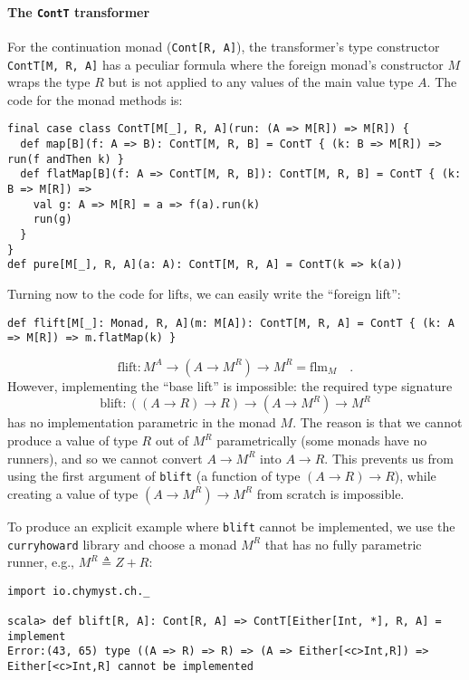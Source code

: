\paragraph{The \texttt{ContT} transformer}

For the continuation monad (\lstinline!Cont[R, A]!), the transformer\textsf{'}s
type constructor \lstinline!ContT[M, R, A]! has a peculiar formula
where the foreign monad\textsf{'}s constructor $M$ wraps the type $R$ but
is not applied to any values of the main value type $A$. The code
for the monad methods is:
\begin{lstlisting}
final case class ContT[M[_], R, A](run: (A => M[R]) => M[R]) {
  def map[B](f: A => B): ContT[M, R, B] = ContT { (k: B => M[R]) => run(f andThen k) }
  def flatMap[B](f: A => ContT[M, R, B]): ContT[M, R, B] = ContT { (k: B => M[R]) =>
    val g: A => M[R] = a => f(a).run(k)
    run(g) 
  }
}
def pure[M[_], R, A](a: A): ContT[M, R, A] = ContT(k => k(a))
\end{lstlisting}

Turning now to the code for lifts, we can easily write the \textsf{``}foreign
lift\textsf{''}:
\begin{lstlisting}
def flift[M[_]: Monad, R, A](m: M[A]): ContT[M, R, A] = ContT { (k: A => M[R]) => m.flatMap(k) }
\end{lstlisting}
\[
\text{flift}:M^{A}\rightarrow(A\rightarrow M^{R})\rightarrow M^{R}=\text{flm}_{M}\quad.
\]
However, implementing the \textsf{``}base lift\textsf{''} is impossible: the required
type signature
\[
\text{blift}:(\left(A\rightarrow R\right)\rightarrow R)\rightarrow(A\rightarrow M^{R})\rightarrow M^{R}
\]
has no implementation parametric in the monad $M$. The reason is
that we cannot produce a value of type $R$ out of $M^{R}$ parametrically
(some monads have no runners), and so we cannot convert $A\rightarrow M^{R}$
into $A\rightarrow R$. This prevents us from using the first argument
of \lstinline!blift! (a function of type $(A\rightarrow R)\rightarrow R$),
while creating a value of type $(A\rightarrow M^{R})\rightarrow M^{R}$
from scratch is impossible. 

To produce an explicit example where \lstinline!blift! cannot be
implemented, we use the \texttt{curryhoward} library and choose a
monad $M^{R}$ that has no fully parametric runner, e.g., $M^{R}\triangleq Z+R$:
\begin{lstlisting}
import io.chymyst.ch._

scala> def blift[R, A]: Cont[R, A] => ContT[Either[Int, *], R, A] = implement
Error:(43, 65) type ((A => R) => R) => (A => Either[<c>Int,R]) => Either[<c>Int,R] cannot be implemented
\end{lstlisting}

